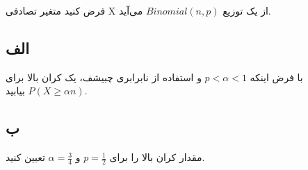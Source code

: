 فرض کنید متغیر تصادفی X از یک توزیع
$
Binomial(n, p)
$
می‌آید.
\subsection*{الف}
با فرض اینکه 
$
p < \alpha < 1
$
و استفاده از نابرابری چبیشف، یک کران بالا برای 
$
P(X \ge \alpha n)
$
بیابید.

\subsection*{ب}
مقدار کران بالا را برای 
$
p = \frac{1}{2}
$
و
$
\alpha = \frac{3}{4}
$ 
تعیین کنید.
